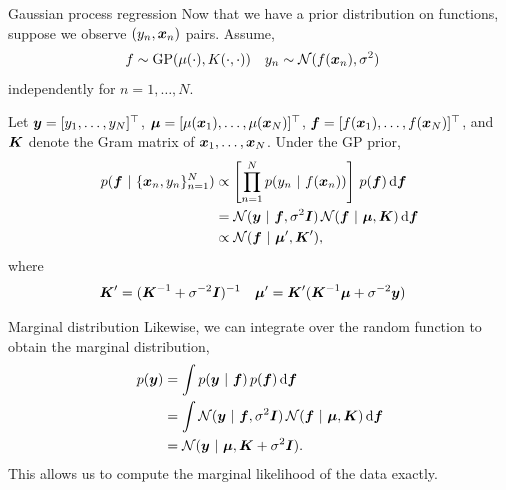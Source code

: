 \documentclass[aspectratio=169]{beamer}
\begin{document}
\begin{frame}{Gaussian process regression}
Now that we have a prior distribution on functions, suppose we observe $(y_n, \boldsymbol{x}_n)$ pairs. Assume,
\begin{align}
    f &\sim \mathrm{GP}(\mu(\cdot), K(\cdot, \cdot)) & y_n & \sim \mathcal{N}(f(\boldsymbol{x}_n), \sigma^2)
\end{align}
independently for $n=1,\ldots,N$.

Let $\boldsymbol{y} = [y_1, \ldots, y_N]^\top$, $\boldsymbol{\mu} = [\mu(\boldsymbol{x}_1), \ldots, \mu(\boldsymbol{x}_N)]^\top$, $\boldsymbol{f} = [f(\boldsymbol{x}_1), \ldots, f(\boldsymbol{x}_N)]^\top$, and $\boldsymbol{K}$ denote the Gram matrix of $\boldsymbol{x}_1,\ldots, \boldsymbol{x}_N$. Under the GP prior, 
\begin{align}
    p(\boldsymbol{f} ~\vert~ \{\boldsymbol{x}_n, y_n\}_{n=1}^N) 
    &\propto \left[\prod_{n=1}^N p(y_{n} ~\vert~ f(\boldsymbol{x}_n))\right] \, p(\boldsymbol{f}) \mathop{}\!\mathrm{d} \boldsymbol{f} \\
    &= \mathcal{N}(\boldsymbol{y} ~\vert~ \boldsymbol{f}, \sigma^2 \boldsymbol{I}) \, \mathcal{N}(\boldsymbol{f} ~\vert~ \boldsymbol{\mu}, \boldsymbol{K}) \mathop{}\!\mathrm{d} \boldsymbol{f} \\
    &\propto \mathcal{N}(\boldsymbol{f} ~\vert~ \boldsymbol{\mu}', \boldsymbol{K}'),
\end{align}
where
\begin{align}
    \boldsymbol{K}' &= (\boldsymbol{K}^{-1} + \sigma^{-2} \boldsymbol{I})^{-1} & 
    \boldsymbol{\mu}' &= \boldsymbol{K}'(\boldsymbol{K}^{-1} \boldsymbol{\mu} + \sigma^{-2} \boldsymbol{y}) 
\end{align}
\end{frame}

\begin{frame}{Marginal distribution}
Likewise, we can integrate over the random function to obtain the marginal distribution,
\begin{align}
    p(\boldsymbol{y}) &= \int p(\boldsymbol{y} ~\vert~ \boldsymbol{f}) \, p(\boldsymbol{f}) \mathop{}\!\mathrm{d} \boldsymbol{f} \\
    &= \int \mathcal{N}(\boldsymbol{y} ~\vert~ \boldsymbol{f}, \sigma^2 \boldsymbol{I}) \, \mathcal{N}(\boldsymbol{f} ~\vert~ \boldsymbol{\mu}, \boldsymbol{K}) \mathop{}\!\mathrm{d} \boldsymbol{f} \\
    &= \mathcal{N}(\boldsymbol{y} ~\vert~ \boldsymbol{\mu}, \boldsymbol{K} + \sigma^2 \boldsymbol{I}).
\end{align}
This allows us to compute the marginal likelihood of the data exactly.

\end{frame}
\end{document}
